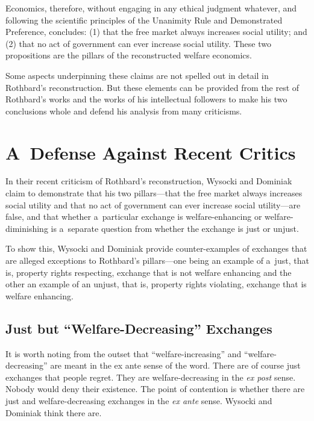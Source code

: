 Economics, therefore, without engaging in any ethical judgment whatever, and following the scientific principles of the Unanimity Rule and Demonstrated Preference, concludes: (1) that the free market always increases social utility; and (2) that no act of government can ever increase social utility. These two propositions are the pillars of the reconstructed welfare economics.



Some aspects underpinning these claims are not spelled out in detail in Rothbard's reconstruction. But these elements can be provided from the rest of Rothbard's works and the works of his intellectual followers to make his two conclusions whole and defend his analysis from many criticisms.



\section{A~Defense Against Recent Critics}

In their recent criticism of Rothbard's reconstruction, Wysocki and Dominiak 
\parencite*[][]{wysocki_how_2023} %
 claim to demonstrate that his two pillars---that the free market always increases social utility and that no act of government can ever increase social utility---are false, and that whether a~particular exchange is welfare-enhancing or welfare-diminishing is a~separate question from whether the exchange is just or unjust.



To show this, Wysocki and Dominiak 
\parencite*[][]{wysocki_how_2023} %
 provide counter-examples of exchanges that are alleged exceptions to Rothbard's pillars---one being an example of a~just, that is, property rights respecting, exchange that is not welfare enhancing and the other an example of an unjust, that is, property rights violating, exchange that is welfare enhancing.



\subsection{Just but ``Welfare-Decreasing'' Exchanges}



It is worth noting from the outset that ``welfare-increasing'' and ``welfare-decreasing'' are meant in the ex ante sense of the word. There are of course just exchanges that people regret. They are welfare-decreasing in the \textit{ex post} sense. Nobody would deny their existence. The point of contention is whether there are just and welfare-decreasing exchanges in the \textit{ex ante} sense. Wysocki and Dominiak 
\parencite*[][]{wysocki_how_2023} %
 think there are.



